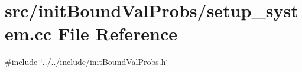 \section{src/init\+Bound\+Val\+Probs/setup\+\_\+system.cc File Reference}
\label{setup__system_8cc}
{\ttfamily \#include \char`\"{}../../include/init\+Bound\+Val\+Probs.\+h\char`\"{}}\newline
